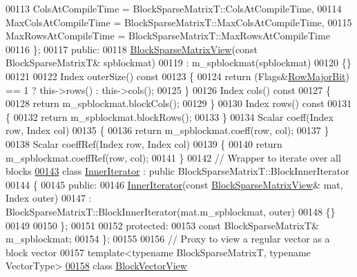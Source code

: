 \begin{DoxyCode}
00113       ColsAtCompileTime = BlockSparseMatrixT::ColsAtCompileTime,
00114       MaxColsAtCompileTime = BlockSparseMatrixT::MaxColsAtCompileTime,
00115       MaxRowsAtCompileTime = BlockSparseMatrixT::MaxRowsAtCompileTime
00116     \};
00117   \textcolor{keyword}{public}:
00118     \hyperlink{class_eigen_1_1_block_sparse_matrix_view}{BlockSparseMatrixView}(\textcolor{keyword}{const} BlockSparseMatrixT& spblockmat)
00119      : m\_spblockmat(spblockmat)
00120     \{\}
00121 
00122     Index outerSize()\textcolor{keyword}{ const}
00123 \textcolor{keyword}{    }\{
00124       \textcolor{keywordflow}{return} (Flags&\hyperlink{group__flags_gae4f56c2a60bbe4bd2e44c5b19cbe8762}{RowMajorBit}) == 1 ? this->rows() : this->cols();
00125     \}
00126     Index cols()\textcolor{keyword}{ const}
00127 \textcolor{keyword}{    }\{
00128       \textcolor{keywordflow}{return} m\_spblockmat.blockCols();
00129     \}
00130     Index rows()\textcolor{keyword}{ const}
00131 \textcolor{keyword}{    }\{
00132       \textcolor{keywordflow}{return} m\_spblockmat.blockRows();
00133     \}
00134     Scalar coeff(Index row, Index col)
00135     \{
00136       \textcolor{keywordflow}{return} m\_spblockmat.coeff(row, col);
00137     \}
00138     Scalar coeffRef(Index row, Index col)
00139     \{
00140       \textcolor{keywordflow}{return} m\_spblockmat.coeffRef(row, col);
00141     \}
00142     \textcolor{comment}{// Wrapper to iterate over all blocks}
\hyperlink{class_eigen_1_1_block_sparse_matrix_view_1_1_inner_iterator}{00143}     \textcolor{keyword}{class }\hyperlink{class_eigen_1_1_block_sparse_matrix_view_1_1_inner_iterator}{InnerIterator} : \textcolor{keyword}{public} BlockSparseMatrixT::BlockInnerIterator
00144     \{
00145       \textcolor{keyword}{public}:
00146       \hyperlink{class_eigen_1_1_block_sparse_matrix_view_1_1_inner_iterator}{InnerIterator}(\textcolor{keyword}{const} \hyperlink{class_eigen_1_1_block_sparse_matrix_view}{BlockSparseMatrixView}& mat, Index outer)
00147           : BlockSparseMatrixT::BlockInnerIterator(mat.m\_spblockmat, outer)
00148       \{\}
00149 
00150     \};
00151 
00152   \textcolor{keyword}{protected}:
00153     \textcolor{keyword}{const} BlockSparseMatrixT& m\_spblockmat;
00154 \};
00155 
00156 \textcolor{comment}{// Proxy to view a regular vector as a block vector}
00157 \textcolor{keyword}{template}<\textcolor{keyword}{typename} BlockSparseMatrixT, \textcolor{keyword}{typename} VectorType>
\hyperlink{class_eigen_1_1_block_vector_view}{00158} \textcolor{keyword}{class }\hyperlink{class_eigen_1_1_block_vector_view}{BlockVectorView}

\end{DoxyCode}
